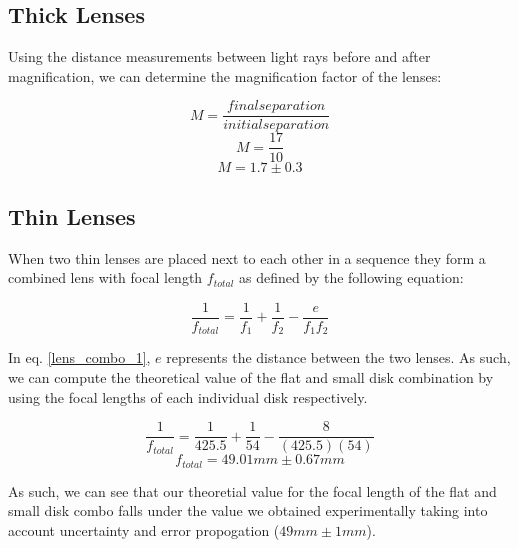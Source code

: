 \documentclass{article}
\begin{document}
\subsection{Thick Lenses}

Using the distance measurements between light rays before and after
magnification, we can determine the magnification factor of the lenses:

\begin{equation}
    \label{magnification_factor_1}
    M = \frac{final separation}{initial separation}
\end{equation}
\begin{equation}
    \label{magnification_factor_2}
    M = \frac{17}{10}
\end{equation}
\begin{equation}
    \label{magnification_factor_3}
    M = 1.7 \pm 0.3
\end{equation}

\subsection{Thin Lenses}

When two thin lenses are placed next to each other in a sequence they form a
combined lens with focal length $f_{total}$ as defined by the following
equation:

\begin{equation}
    \label{lens_combo_1}
    \frac{1}{f_{total}} = \frac{1}{f_{1}}+\frac{1}{f_{2}}-\frac{e}{f_{1}f_{2}}
\end{equation}

In eq. \ref{lens_combo_1}, $e$ represents the distance between the two lenses.
As such, we can compute the theoretical value of the flat and small disk
combination by using the focal lengths of each individual disk respectively.

\begin{equation}
    \label{lens_combo_1}
    \frac{1}{f_{total}} = \frac{1}{425.5}+\frac{1}{54}-\frac{8}{(425.5)(54)}
\end{equation}
\begin{equation}
    \label{lens_combo_1}
    f_{total} = 49.01mm \pm 0.67mm
\end{equation}

As such, we can see that our theoretial value for the focal length of the flat
and small disk combo falls under the value we obtained experimentally taking
into account uncertainty and error propogation ($49mm
\pm 1mm$).
\end{document}
